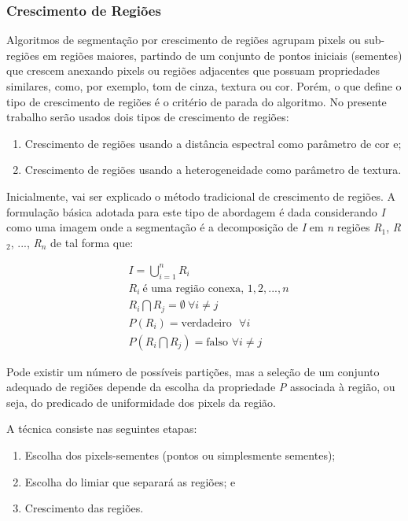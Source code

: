 \subsubsection{Crescimento de Regiões}

Algoritmos de segmentação por crescimento de regiões agrupam pixels ou
sub-regiões em regiões maiores, partindo de um conjunto de pontos
iniciais (sementes) que crescem anexando pixels ou regiões adjacentes
que possuam propriedades similares, como, por exemplo, tom de cinza,
textura ou cor.\cite{110} Porém, o que define o tipo de crescimento de
regiões é o critério de parada do algoritmo. No presente trabalho
serão usados dois tipos de crescimento de regiões:

\begin{enumerate}[label=(\roman{*})]
  \item Crescimento de regiões usando a distância espectral como
    parâmetro de cor e;
  \item Crescimento de regiões usando a heterogeneidade como parâmetro
    de textura.
\end{enumerate}

Inicialmente, vai ser explicado o método tradicional de crescimento de
regiões. A formulação básica adotada para este tipo de abordagem é
dada considerando \textit{I} como uma imagem onde a segmentação é a
decomposição de \textit{I} em \textit{n} regiões \textit{R}$_{1}$,
\textit{R}$_{2}$, ..., \textit{R}$_{n}$ de tal forma que:

\begin{align}
 &I = \bigcup\limits_{i=1}^n R_{i}\\
 &R_{i} ~ \text{é uma região conexa, $1, 2, ..., n$}\\
 &R_{i} \bigcap R_{j} = \emptyset ~ \forall i \neq j\\
 &P\left(R_{i}\right)= \text{verdadeiro ~} \forall i\\
 &P\left(R_{i} \bigcap R_{j}\right)=\text{falso~} \forall i \neq j
\end{align}

Pode existir um número de possíveis partições, mas a seleção de um
conjunto adequado de regiões depende da escolha da propriedade
\textit{P} associada à região, ou seja, do predicado de uniformidade
dos pixels da região.\cite{88}

A técnica consiste nas seguintes etapas:

\begin{enumerate}[label=(\roman{*})]
  \item Escolha dos pixels-sementes (pontos ou simplesmente sementes);
  \item Escolha do limiar que separará as regiões; e
  \item Crescimento das regiões.
\end{enumerate}

